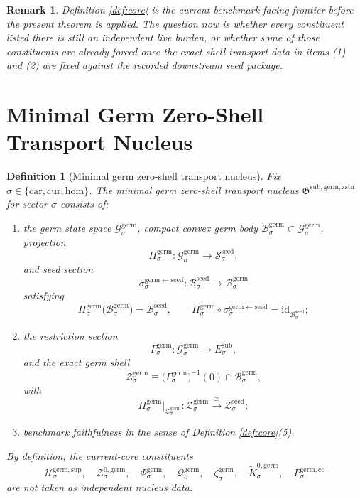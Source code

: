 \documentclass[11pt]{article}
\newcommand{\Car}{\mathrm{car}}
\newcommand{\Cur}{\mathrm{cur}}
\newcommand{\Hom}{\mathrm{hom}}
\newcommand{\SubTarget}[1]{E_{#1}^{\mathrm{sub}}}
\newcommand{\SeedState}[1]{\mathcal S_{#1}^{\mathrm{seed}}}
\newcommand{\SeedBody}[1]{\mathcal B_{#1}^{\mathrm{seed}}}
\newcommand{\SeedShell}[1]{\mathcal Z_{#1}^{\mathrm{seed}}}
\newcommand{\GermNucleus}{\mathfrak G^{\mathrm{sub,germ,zstn}}}
\newcommand{\GermState}[1]{\mathcal G_{#1}^{\mathrm{germ}}}
\newcommand{\GermBody}[1]{\mathcal B_{#1}^{\mathrm{germ}}}
\newcommand{\GermProj}[1]{\Pi_{#1}^{\mathrm{germ}}}
\newcommand{\GermSeedSec}[1]{\sigma_{#1}^{\mathrm{germ\leftarrow seed}}}
\newcommand{\GermSection}[1]{\Gamma_{#1}^{\mathrm{germ}}}
\newcommand{\GermShell}[1]{\mathcal Z_{#1}^{\mathrm{germ}}}
\newcommand{\GermSupportShell}[1]{\mathcal U_{#1}^{\mathrm{germ,sup}}}
\newcommand{\GermZeroCore}[1]{\mathcal Z_{#1}^{0,\mathrm{germ}}}
\newcommand{\GermSplit}[1]{\Phi_{#1}^{\mathrm{germ}}}
\newcommand{\GermCharge}[1]{\mathcal Q_{#1}^{\mathrm{germ}}}
\newcommand{\GermEmbed}[1]{\zeta_{#1}^{\mathrm{germ}}}
\newcommand{\GermKernel}[1]{\widetilde K_{#1}^{0,\mathrm{germ}}}
\newcommand{\GermCoercive}[1]{P_{#1}^{\mathrm{germ,co}}}
\newtheorem{definition}{Definition}
\newtheorem{remark}{Remark}
\begin{document}
\begin{remark}
Definition \ref{def:core} is the current benchmark-facing frontier before the present theorem is applied. The question now is whether every constituent listed there is still an independent live burden, or whether some of those constituents are already forced once the exact-shell transport data in items (1) and (2) are fixed against the recorded downstream seed package.
\end{remark}

\section{Minimal Germ Zero-Shell Transport Nucleus}

\begin{definition}[Minimal germ zero-shell transport nucleus]
\label{def:nucleus}
Fix \(\sigma\in\{\Car,\Cur,\Hom\}\). The \emph{minimal germ zero-shell transport nucleus} \(\GermNucleus\) for sector \(\sigma\) consists of:
\begin{enumerate}
    \item the germ state space \(\GermState{\sigma}\), compact convex germ body \(\GermBody{\sigma}\subset\GermState{\sigma}\), projection
    \[
    \GermProj{\sigma}:\GermState{\sigma}\to\SeedState{\sigma},
    \]
    and seed section
    \[
    \GermSeedSec{\sigma}:\SeedBody{\sigma}\to\GermBody{\sigma}
    \]
    satisfying
    \[
    \GermProj{\sigma}\bigl(\GermBody{\sigma}\bigr)=\SeedBody{\sigma},
    \qquad
    \GermProj{\sigma}\circ\GermSeedSec{\sigma}
    =
    \mathrm{id}_{\SeedBody{\sigma}};
    \]
    \item the restriction section
    \[
    \GermSection{\sigma}:\GermState{\sigma}\to\SubTarget{\sigma},
    \]
    and the exact germ shell
    \[
    \GermShell{\sigma}
    \equiv
    \bigl(\GermSection{\sigma}\bigr)^{-1}(0)\cap\GermBody{\sigma},
    \]
    with
    \[
    \GermProj{\sigma}\big|_{\GermShell{\sigma}}
    :
    \GermShell{\sigma}
    \xrightarrow{\cong}
    \SeedShell{\sigma};
    \]
    \item benchmark faithfulness in the sense of Definition \ref{def:core}(5).
\end{enumerate}
By definition, the current-core constituents
\[
\GermSupportShell{\sigma},
\quad
\GermZeroCore{\sigma},
\quad
\GermSplit{\sigma},
\quad
\GermCharge{\sigma},
\quad
\GermEmbed{\sigma},
\quad
\GermKernel{\sigma},
\quad
\GermCoercive{\sigma}
\]
are \emph{not} taken as independent nucleus data.
\end{definition}
\end{document}
